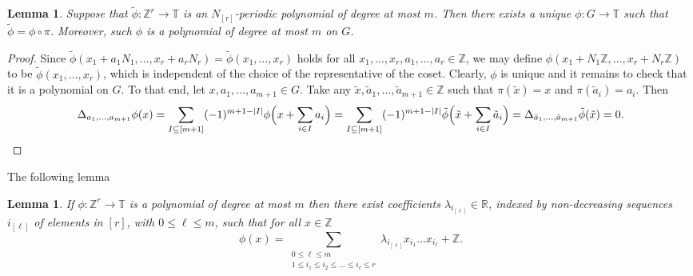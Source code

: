 \documentclass[a4paper,11pt]{article}
\numberwithin{theorem}{section}
\newtheorem{lemma}[theorem]{Lemma}
\theoremstyle{definition}
\newcommand\ssk[1]{
	\substack{#1}
}
\begin{document}
\begin{lemma}
    Suppose that $\tilde{\phi} : \mathbb{Z}^r \to \mathbb{T}$ is an $N_{[r]}$-periodic polynomial of degree at most $m$. Then there exists a unique $\phi : G \to \mathbb{T}$ such that $\tilde{\phi} = \phi \circ \pi$. Moreover, such $\phi$ is a polynomial of degree at most $m$ on $G$.
\end{lemma}

\begin{proof}
    Since $\tilde{\phi}(x_1 + a_1 N_1, \dots, x_r + a_r N_r) = \tilde{\phi}(x_1, \dots, x_r)$ holds for all $x_1, \dots, x_r,a_1, \dots, a_r \in \mathbb{Z}$, we may define $\phi(x_1 + N_1 \mathbb{Z}, \dots, x_r + N_r \mathbb{Z})$ to be $\tilde{\phi}(x_1, \dots, x_r)$, which is independent of the choice of the representative of the coset. Clearly, $\phi$ is unique and it remains to check that it is a polynomial on $G$. To that end, let $x, a_1, \dots, a_{m+1} \in G$. Take any $\tilde{x}, \tilde{a}_1, \dots, \tilde{a}_{m+1} \in \mathbb{Z}$ such that $\pi(\tilde{x}) = x$ and $\pi(\tilde{a}_i) = a_i$. Then
    \[\Delta_{a_1, \dots, a_{m+1}} \phi(x) = \sum_{I \subseteq [m+1]} (-1)^{m + 1 - |I|} \phi\Big(x + \sum_{i \in I} a_i\Big) = \sum_{I \subseteq [m + 1]} (-1)^{m + 1 - |I|} \tilde{\phi}\Big(\tilde{x} + \sum_{i \in I} \tilde{a}_i\Big) = \Delta_{\tilde{a}_1, \dots, \tilde{a}_{m+1}} \tilde{\phi}(\tilde{x}) = 0.\qedhere\]
\end{proof}

The following lemma 

\begin{lemma}\label{zpolynomials}
    If $\phi : \mathbb{Z}^r \to \mathbb{T}$ is a polynomial of degree at most $m$ then there exist coefficients $\lambda_{i_{[\ell]}} \in \mathbb{R}$, indexed by non-decreasing sequences $i_{[\ell]}$ of elements in $[r]$, with $0 \leq \ell \leq m$, such that for all $x\in \mathbb{Z}$
    \[\phi(x) = \sum_{\ssk{0 \leq \ell \leq m\\1\leq i_1 \leq i_2 \leq \dots \leq i_\ell \leq r}} \lambda_{i_{[\ell]}} x_{i_1} \dots x_{i_\ell} + \mathbb{Z}.\]
\end{lemma}
\end{document}
